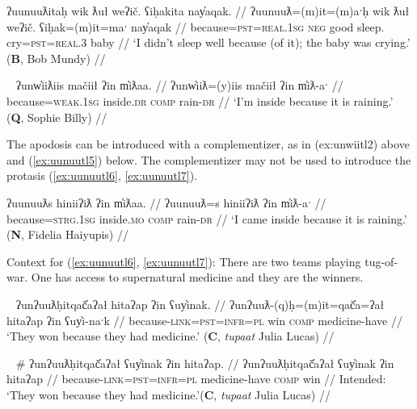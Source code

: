 
\ex \label{ex:uunuutl1}
\begingl
\glpreamble ʔuunuuƛitaḥ wik ƛuł weʔič. ʕiḥakita nay̓aqak. //
\gla ʔuunuuƛ=(m)it=(m)aˑḥ wik ƛuł weʔič. ʕiḥak=(m)it=maˑ nay̓aqak //
\glb because=\textsc{pst}=\textsc{real.1sg} \textsc{neg} good sleep. cry=\textsc{pst}=\textsc{real.3} baby //
\glft `I didn't sleep well because (of it); the baby was crying.' (\textbf{B}, Bob Mundy) //
\endgl
\xe

\ex~ \label{ex:unwiitl2}
\begingl
\glpreamble ʔunw̓iiƛiis mačiił ʔin m̓iƛaa. //
\gla ʔunw̓iiƛ=(y)iis mačiił ʔin m̓iƛ-aˑ //
\glb because=\textsc{weak.1sg} inside.\textsc{dr} \textsc{comp} rain-\textsc{dr} //
\glft `I'm inside because it is raining.' (\textbf{Q}, Sophie Billy) //
\endgl
\xe

The apodosis can be introduced with a complementizer, as in ({ex:unwiitl2}) above and (\ref{ex:uunuutl5}) below. The complementizer may not be used to introduce the protasis (\ref{ex:uunuutl6}, \ref{ex:uunuutl7}).

\ex \label{ex:uunuutl5}
\begingl
\glpreamble ʔuunuuƛs hiniiʔiƛ ʔin m̓iƛaa. //
\gla ʔuunuuƛ=s hiniiʔiƛ ʔin m̓iƛ-aˑ //
\glb because=\textsc{strg.1sg} inside.\textsc{mo} \textsc{comp} rain-\textsc{dr} //
\glft `I came inside because it is raining.' (\textbf{N}, Fidelia Haiyupis) //
\endgl
\xe

\vspace{5pt}

Context for (\ref{ex:uunuutl6}, \ref{ex:uunuutl7}): There are two teams playing tug-of-war. One has access to supernatural medicine and they are the winners.

\ex~ \label{ex:uunuutl6}
\begingl
\glpreamble ʔunʔuuƛḥitqač̓aʔał hitaʔap ʔin ʕuy̓inak. //
\gla ʔunʔuuƛ-(q)ḥ=(m)it=qač̓a=ʔał hitaʔap ʔin ʕuy̓i-naˑk //
\glb because-\textsc{link}=\textsc{pst}=\textsc{infr}=\textsc{pl} win \textsc{comp} medicine-have //
\glft `They won because they had medicine.' (\textbf{C}, \textit{tupaat} Julia Lucas) //
\endgl
\xe

\ex~ \label{ex:uunuutl7}
\begingl
\glpreamble \# ʔunʔuuƛḥitqač̓aʔał ʕuy̓inak ʔin hitaʔap. //
\gla ʔunʔuuƛḥitqač̓aʔał ʕuy̓inak ʔin hitaʔap //
\glb because-\textsc{link}=\textsc{pst}=\textsc{infr}=\textsc{pl} medicine-have \textsc{comp} win //
\glft Intended: `They won because they had medicine.'\footnotemark (\textbf{C}, \textit{tupaat} Julia Lucas) //
\endgl
\xe

